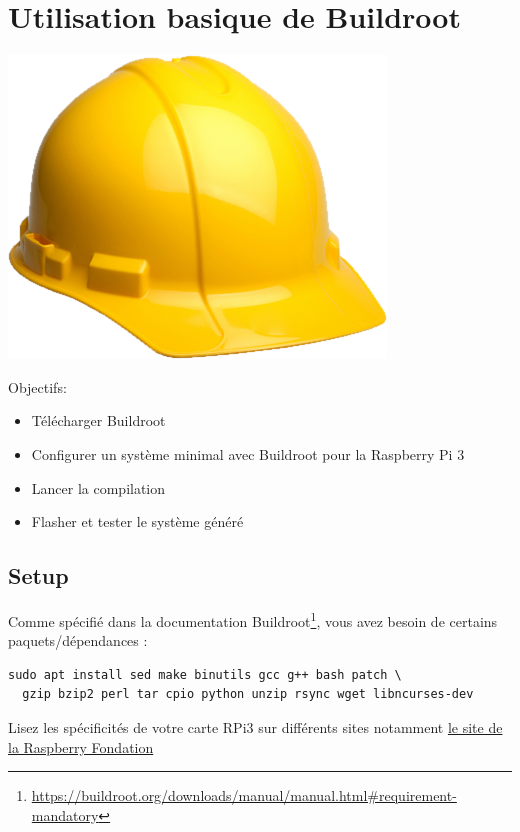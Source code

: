 \chapter {Utilisation basique de Buildroot}
\begin{centering}
  \includegraphics[height=0.1\textheight]{pictures/br.png} \\
\end{centering}
{Objectifs:
  \begin{itemize}
  \item Télécharger Buildroot
  \item Configurer un système minimal avec Buildroot pour la Raspberry Pi 3
  \item Lancer la compilation
  \item Flasher et tester le système généré
  \end{itemize}
}

\section{Setup}

Comme spécifié dans la documentation Buildroot\footnote{\url{https://buildroot.org/downloads/manual/manual.html\#requirement-mandatory}}, vous avez besoin de certains paquets/dépendances :

\begin{verbatim}
sudo apt install sed make binutils gcc g++ bash patch \
  gzip bzip2 perl tar cpio python unzip rsync wget libncurses-dev
\end{verbatim}

Lisez les spécificités de votre carte RPi3 sur différents sites notamment \href{https://www.raspberrypi.org/products/raspberry-pi-3-model-b/}{le site de la Raspberry Fondation}


